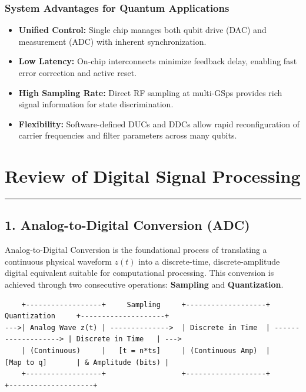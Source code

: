 \documentclass[
]{article}
\providecommand{\tightlist}{%
  \setlength{\itemsep}{0pt}\setlength{\parskip}{0pt}}
\begin{document}
\subsubsection{System Advantages for Quantum
Applications}\label{system-advantages-for-quantum-applications}

\begin{itemize}
\tightlist
\item
  \textbf{Unified Control:} Single chip manages both qubit drive (DAC)
  and measurement (ADC) with inherent synchronization.
\item
  \textbf{Low Latency:} On-chip interconnects minimize feedback delay,
  enabling fast error correction and active reset.
\item
  \textbf{High Sampling Rate:} Direct RF sampling at multi-GSps provides
  rich signal information for state discrimination.
\item
  \textbf{Flexibility:} Software-defined DUCs and DDCs allow rapid
  reconfiguration of carrier frequencies and filter parameters across
  many qubits.
\end{itemize}

\section{Review of Digital Signal
Processing}\label{review-of-digital-signal-processing}

\begin{center}\rule{0.5\linewidth}{0.5pt}\end{center}

\subsection{1. Analog-to-Digital Conversion
(ADC)}\label{analog-to-digital-conversion-adc}

Analog-to-Digital Conversion is the foundational process of translating
a continuous physical waveform \(z(t)\) into a discrete-time,
discrete-amplitude digital equivalent suitable for computational
processing. This conversion is achieved through two consecutive
operations: \textbf{Sampling} and \textbf{Quantization}.

\begin{verbatim}
    +------------------+     Sampling     +-------------------+     Quantization     +--------------------+
--->| Analog Wave z(t) | -------------->  | Discrete in Time  | -------------------> | Discrete in Time   | --->
    | (Continuous)     |   [t = n*ts]     | (Continuous Amp)  |     [Map to q]       | & Amplitude (bits) |
    +------------------+                  +-------------------+                      +--------------------+
\end{verbatim}
\end{document}
